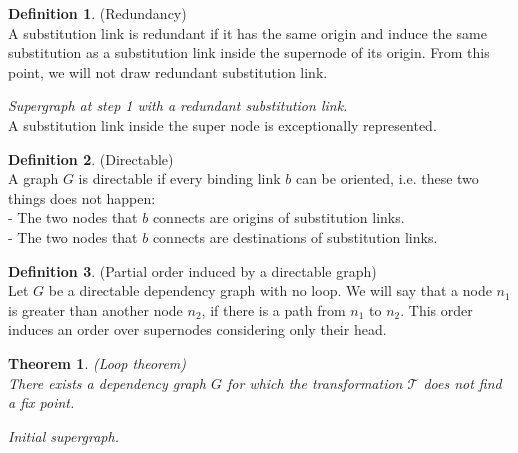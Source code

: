 \documentclass[a4paper, 11pt]{article}
\theoremstyle{plain}
\newtheorem*{thm}{Theorem}
\theoremstyle{definition}
\newtheorem*{mydef}{Definition}
\theoremstyle{remark}
\begin{document}
\begin{mydef} (Redundancy)
\\A substitution link is redundant if it has the same origin and induce the same substitution as a substitution link inside the supernode of its origin. From this point, we will not draw redundant substitution link.
\end{mydef}
\noindent \textit{Supergraph at step 1 with a redundant substitution link.}
\\A substitution link inside the super node is exceptionally represented.

\begin{center}
\end{center}

\begin{mydef} (Directable)
\\A graph $G$ is directable if every binding link $b$ can be oriented, i.e.  these two things does not happen:
\\ - The two nodes that $b$ connects are origins of substitution links.
\\ - The two nodes that $b$ connects are destinations of substitution links.
\end{mydef}

\begin{mydef} (Partial order induced by a directable graph)
\\Let $G$ be a directable dependency graph with no loop. We will say that a node $n_1$ is greater than another node $n_2$, if there is a path from $n_1$ to $n_2$. This order induces an order over supernodes considering only their head.
\end{mydef}

\begin{thm} (Loop theorem)
\\There exists a dependency graph $G$ for which the transformation $\mathcal{T}$ does not find a fix point.
\end{thm}

\noindent \textit{Initial supergraph.}
\begin{center}
\end{center}
\end{document}
